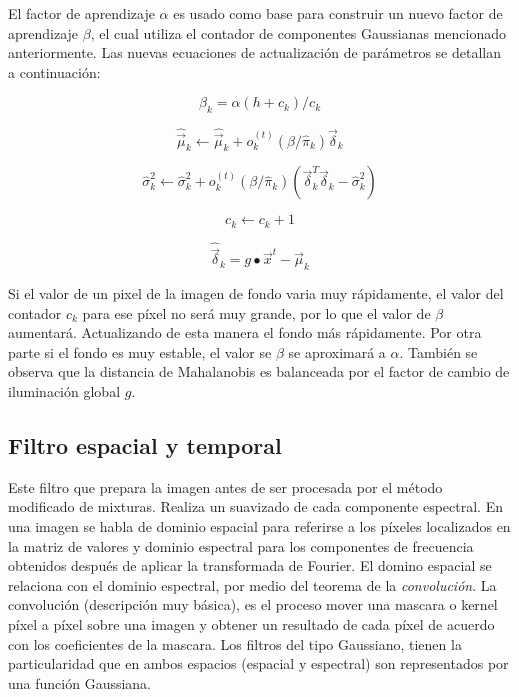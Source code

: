 El factor de aprendizaje $\alpha$ es usado como base para construir un nuevo factor de aprendizaje $\beta$, el cual utiliza el contador de componentes Gaussianas mencionado anteriormente. Las nuevas ecuaciones de actualización de parámetros se detallan a continuación:


\begin{equation} \label{eq:sagmm_betha}
\beta_k = \alpha(h + c_k)/c_k
\end{equation}

\begin{equation} \label{eq:sagmm_mu}
\hat{\vec{\mu}}_k \leftarrow \hat{\vec{\mu}}_k + o^{(t)}_k (\beta/\hat{\pi}_k) \vec{\delta}_k
\end{equation}

\begin{equation} \label{eq:sagmm_sigma}
\hat{\sigma}^2_k \leftarrow \hat{\sigma}^2_k + o^{(t)}_k (\beta/\hat{\pi}_k) (\vec{\delta}^T_k \vec{\delta}_k - \hat{\sigma}^2_k)
\end{equation}

\begin{equation} \label{eq:sagmm_ck}
c_k \leftarrow c_k + 1
\end{equation}

\begin{equation} \label{eq:sagmm_delta}
\hat{\vec{\delta}}_k = g \bullet \vec{x}^{t} - \hat{\vec{\mu}}_k
\end{equation}

Si el valor de un pixel de la imagen de fondo varia muy rápidamente, el valor del contador $c_k$ para ese píxel no será muy grande, por lo que el valor de $\beta$ aumentará. Actualizando de esta manera el fondo más rápidamente. Por otra parte si el fondo es muy estable, el valor se $\beta$ se aproximará a $\alpha$. También se observa que la distancia de Mahalanobis es balanceada por el factor de cambio de iluminación global $g$.


\subsection{Filtro espacial y temporal}
Este filtro que prepara la imagen antes de ser procesada por el método modificado de mixturas. Realiza un suavizado de cada componente espectral. En una imagen se habla de dominio espacial para referirse a los píxeles localizados en la matriz de valores y dominio espectral para los componentes de frecuencia obtenidos después de aplicar la transformada de Fourier. El domino espacial se relaciona con el dominio espectral, por medio del teorema de la \textit{convolución}. La convolución (descripción muy básica), es el proceso mover una mascara o kernel píxel a píxel sobre una imagen y obtener un resultado de cada píxel de acuerdo con los coeficientes de la mascara. Los filtros del tipo Gaussiano, tienen la particularidad que en ambos espacios (espacial y espectral) son representados por una función Gaussiana.


